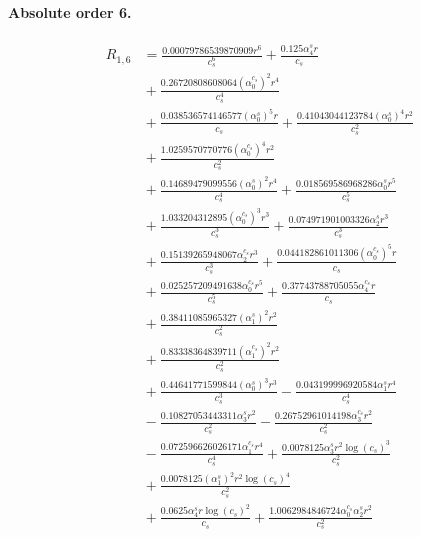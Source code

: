 \documentclass[10pt]{article}
\begin{document}
\paragraph{Absolute order 6.}
\begin{align*}
R_{1,6} &= \frac{0.00079786539870909 r^{6}}{c_{s}^{6}} + \frac{0.125 \alpha_{4}^s r}{c_{s}} \\
&{}  + \frac{0.26720808608064 \left(\alpha_{0}^{c_s}\right)^{2} r^{4}}{c_{s}^{4}} \\
&{}  + \frac{0.038536574146577 \left(\alpha_{0}^s\right)^{5} r}{c_{s}} + \frac{0.41043044123784 \left(\alpha_{0}^s\right)^{4} r^{2}}{c_{s}^{2}} \\
&{}  + \frac{1.0259570770776 \left(\alpha_{0}^{c_s}\right)^{4} r^{2}}{c_{s}^{2}} \\
&{}  + \frac{0.14689479099556 \left(\alpha_{0}^s\right)^{2} r^{4}}{c_{s}^{4}} + \frac{0.018569586968286 \alpha_{0}^s r^{5}}{c_{s}^{5}} \\
&{}  + \frac{1.033204312895 \left(\alpha_{0}^{c_s}\right)^{3} r^{3}}{c_{s}^{3}} + \frac{0.074971901003326 \alpha_{2}^s r^{3}}{c_{s}^{3}} \\
&{}  + \frac{0.15139265948067 \alpha_{2}^{c_s} r^{3}}{c_{s}^{3}} + \frac{0.044182861011306 \left(\alpha_{0}^{c_s}\right)^{5} r}{c_{s}} \\
&{}  + \frac{0.025257209491638 \alpha_{0}^{c_s} r^{5}}{c_{s}^{5}} + \frac{0.37743788705055 \alpha_{4}^{c_s} r}{c_{s}} \\
&{}  + \frac{0.38411085965327 \left(\alpha_{1}^s\right)^{2} r^{2}}{c_{s}^{2}} \\
&{}  + \frac{0.83338364839711 \left(\alpha_{1}^{c_s}\right)^{2} r^{2}}{c_{s}^{2}} \\
&{}  + \frac{0.44641771599844 \left(\alpha_{0}^s\right)^{3} r^{3}}{c_{s}^{3}} - \frac{0.043199996920584 \alpha_{1}^s r^{4}}{c_{s}^{4}} \\
&{}  - \frac{0.10827053443311 \alpha_{3}^s r^{2}}{c_{s}^{2}} - \frac{0.26752961014198 \alpha_{3}^{c_s} r^{2}}{c_{s}^{2}} \\
&{}  - \frac{0.072596626026171 \alpha_{1}^{c_s} r^{4}}{c_{s}^{4}} + \frac{0.0078125 \alpha_{3}^s r^{2} \log{\left(c_{s} \right)}^{3}}{c_{s}^{2}} \\
&{}  + \frac{0.0078125 \left(\alpha_{1}^s\right)^{2} r^{2} \log{\left(c_{s} \right)}^{4}}{c_{s}^{2}} \\
&{}  + \frac{0.0625 \alpha_{4}^s r \log{\left(c_{s} \right)}^{2}}{c_{s}} + \frac{1.0062984846724 \alpha_{0}^{c_s} \alpha_{2}^s r^{2}}{c_{s}^{2}} \\

\end{align*}
\end{document}
